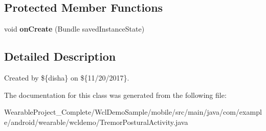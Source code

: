\subsection*{Protected Member Functions}
\begin{DoxyCompactItemize}
\item 
void {\bfseries on\+Create} (Bundle saved\+Instance\+State)\hypertarget{classcom_1_1example_1_1android_1_1wearable_1_1wcldemo_1_1TremorPosturalActivity_a7ec0ddbfc13e41e34810431f822a5dda}{}\label{classcom_1_1example_1_1android_1_1wearable_1_1wcldemo_1_1TremorPosturalActivity_a7ec0ddbfc13e41e34810431f822a5dda}

\end{DoxyCompactItemize}


\subsection{Detailed Description}
Created by \$\{disha\} on \$\{11/20/2017\}. 

The documentation for this class was generated from the following file\+:\begin{DoxyCompactItemize}
\item 
Wearable\+Project\+\_\+\+Complete/\+Wcl\+Demo\+Sample/mobile/src/main/java/com/example/android/wearable/wcldemo/Tremor\+Postural\+Activity.\+java\end{DoxyCompactItemize}
